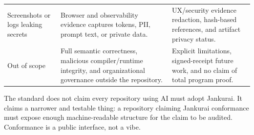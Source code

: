 \begin{table}[t]
\begin{tabularx}{\textwidth}{L{0.18\textwidth} Y Y}
Screenshots or logs leaking secrets & Browser and observability evidence captures tokens, PII, prompt text, or private data. & UX/security evidence redaction, hash-based references, and artifact privacy status. \\
Out of scope & Full semantic correctness, malicious compiler/runtime integrity, and organizational governance outside the repository. & Explicit limitations, signed-receipt future work, and no claim of total program proof. \\
\bottomrule
\end{tabularx}
\end{table}

The standard does not claim every repository using AI must adopt Jankurai. It claims a narrower and testable thing: a repository claiming Jankurai conformance must expose enough machine-readable structure for the claim to be audited. Conformance is a public interface, not a vibe.
